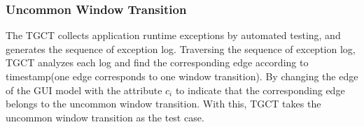 
\subsubsection{Uncommon Window Transition}
The TGCT collects application runtime exceptions by automated testing, and generates the sequence of exception log. Traversing the sequence of exception log, TGCT analyzes each log and find the corresponding edge according to timestamp(one edge corresponds to one window transition). By changing the edge of the GUI model with the attribute $c_{i}$ to indicate that the corresponding edge belongs to the uncommon window transition. With this, TGCT takes the uncommon window transition as the test case.



